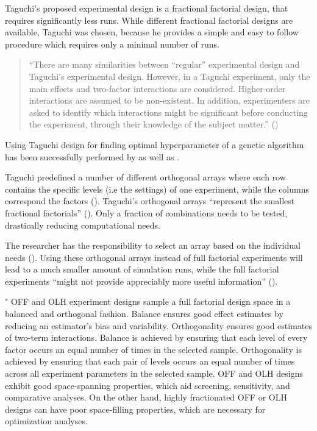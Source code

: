 Taguchi's proposed experimental design is a fractional factorial design, that requires significantly less runs. While different fractional factorial designs are available, Taguchi was chosen, because he provides a simple and easy to follow procedure which requires only a minimal number of runs.

\begin{quote}
	\begin{em}
		\enquote{There are many similarities between “regular” experimental design and Taguchi's experimental design. However, in a Taguchi experiment, only the main effects and two-factor interactions are considered. Higher-order interactions are assumed to be non-existent. In addition, experimenters are asked to identify which interactions might be significant before conducting the experiment, through their knowledge of the subject matter.} (\cite{yang_design_2009})
	\end{em}
\end{quote}

Using Taguchi design for finding optimal hyperparameter of a genetic algorithm has been successfully performed by \cite{dao_maximising_2016} as well as \cite{naruka_parameter_2019}.

Taguchi predefined a number of different orthogonal arrays where each row contains the specific levels (i.e the settings) of one experiment, while the columns correspond the factors (\cite{li_taguchi_2021}). Taguchi's orthogonal arrays \enquote{represent the smallest fractional factorials} (\cite{roy_primer_1990}). Only a fraction of combinations needs to be tested, drastically reducing computational needs.

The researcher has the responsibility to select an array based on the individual needs (\cite{li_taguchi_2021}).
Using these orthogonal arrays instead of full factorial experiments will lead to a much smaller amount of simulation runs, while the full factorial experiments \enquote{might not provide appreciably more useful information} (\cite{roy_primer_1990}).

\iffalse
" OFF and OLH experiment designs sample a full factorial design space in a balanced and orthogonal fashion. Balance ensures good effect estimates by reducing an estimator’s bias and variability. Orthogonality ensures good estimates of two-term interactions. Balance is achieved by ensuring that each level of every factor occurs an equal number of times in the selected sample. Orthogonality is achieved by ensuring that each pair of levels occurs an equal number of times across all experiment parameters in the selected sample. OFF and OLH designs exhibit good space-spanning properties, which aid screening, sensitivity, and comparative analyses. On the other hand, highly fractionated OFF or OLH designs can have poor space-filling properties, which are necessary for optimization analyses.

